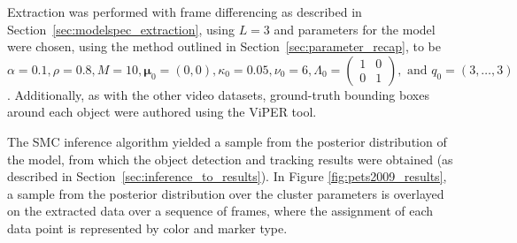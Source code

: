 \documentclass[twocolumn, final]{svjour3}
\begin{document}
Extraction was performed with frame differencing as described in Section~\ref{sec:modelspec_extraction}, using $L=3$ and parameters for the model were chosen, using the method outlined in Section~\ref{sec:parameter_recap}, to be $\alpha = 0.1, \rho = 0.8, M = 10, \boldsymbol{\mu}_{0} = (0,0), \kappa_{0} = 0.05, \nu_{0} = 6, \Lambda_{0} = \left( \begin{smallmatrix} 1&0\\ 0&1 \end{smallmatrix} \right), \text{ and } q_{0} = (3, \ldots, 3)$. Additionally, as with the other video datasets, ground-truth bounding boxes around each object were authored using the ViPER tool.

The SMC inference algorithm yielded a sample from the posterior distribution of the model, from which the object detection and tracking results were obtained (as described in Section~\ref{sec:inference_to_results}). In Figure \ref{fig:pets2009_results}, a sample from the posterior distribution over the cluster parameters is overlayed on the extracted data over a sequence of frames, where the assignment of each data point is represented by color and marker type.
\end{document}
